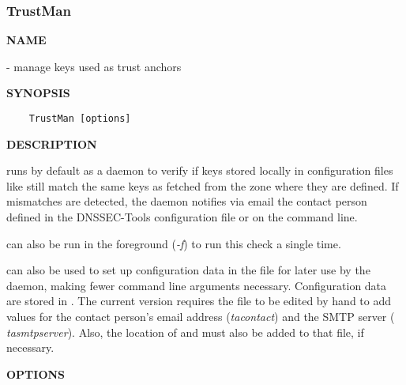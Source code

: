 \clearpage

\subsubsection{\bf TrustMan}

{\bf NAME}

 - manage keys used as trust anchors

{\bf SYNOPSIS}

\begin{verbatim}
    TrustMan [options]
\end{verbatim}

{\bf DESCRIPTION}

 runs by default as a daemon to verify if keys stored locally in
configuration files like  still match the same keys as fetched
from the zone where they are defined.  If mismatches are detected, the daemon
notifies via email the contact person defined in the DNSSEC-Tools
configuration file or on the command line.

 can also be run in the foreground ({\it -f}) to run this check
a single time.

 can also be used to set up configuration data in the file
 for later use by the daemon, making fewer command
line arguments necessary.  Configuration data are stored in
.  The current version requires the
 file to be edited by hand to add values for the
contact person's email address ({\it tacontact}) and the SMTP server ({\it
tasmtpserver}).  Also, the location of  and
 must also be added to that file, if necessary.

{\bf OPTIONS}

